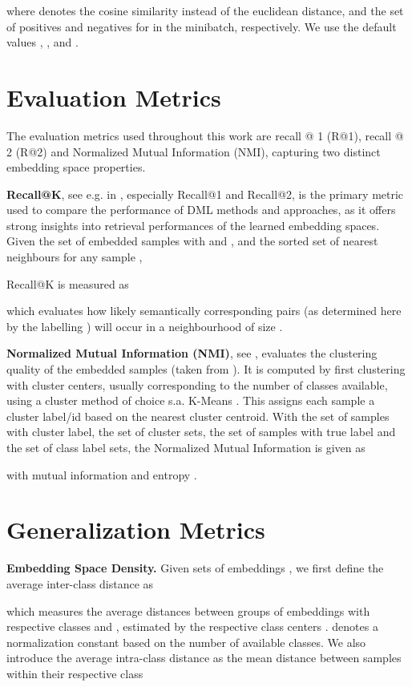 \documentclass{article} \usepackage{arxiv_style,times}
\begin{document}
where  denotes the cosine similarity instead of the euclidean distance, and  the set of positives and negatives for  in the minibatch, respectively. We use the default values , ,  and .



\section{Evaluation Metrics}\label{supp:eval_metrics}
The evaluation metrics used throughout this work are recall @ 1 (R@1), recall @ 2 (R@2) and Normalized Mutual Information (NMI), capturing two distinct embedding space properties.

\textbf{Recall@K}, see e.g. in \cite{recall}, especially Recall@1 and Recall@2, is the primary metric used to compare the performance of DML methods and approaches, as it offers strong insights into retrieval performances of the learned embedding spaces. Given the set of embedded samples  with  and , and the sorted set of  nearest neighbours for any sample ,

Recall@K is measured as

which evaluates how likely semantically corresponding pairs (as determined here by the labelling ) will occur in a neighbourhood of size .


\textbf{Normalized Mutual Information (NMI)}, see \cite{nmi}, evaluates the clustering quality of the embedded samples  (taken from ). It is computed by first clustering with  cluster centers, usually corresponding to the number of classes available, using a cluster method of choice s.a. K-Means \citep{kmeans}. This assigns each sample  a cluster label/id  based on the nearest cluster centroid. With  the set of samples with cluster label,  the set of cluster sets,  the set of samples with true label  and  the set of class label sets, the Normalized Mutual Information is given as

with mutual information  and entropy .


\section{Generalization Metrics}\label{supp:gen_metrics}
\textbf{Embedding Space Density.} Given sets of embeddings , we first define the average inter-class distance as

which measures the average distances between groups of embeddings with respective classes  and , estimated by the respective class centers .  denotes a normalization constant based on the number of available classes. We also introduce the average intra-class distance as the mean distance between samples within their respective class
\end{document}
